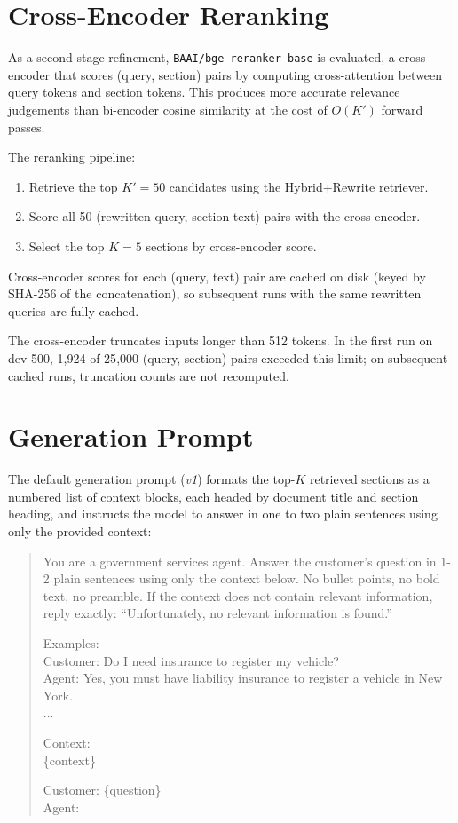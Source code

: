 \section{Cross-Encoder Reranking}\label{sec:rag:reranker}

As a second-stage refinement, \texttt{BAAI/bge-reranker-base} is evaluated, a
cross-encoder that scores (query, section) pairs by computing cross-attention
between query tokens and section tokens. This produces more accurate relevance
judgements than bi-encoder cosine similarity at the cost of $O(K')$ forward passes.

The reranking pipeline:
\begin{enumerate}
    \item Retrieve the top $K' = 50$ candidates using the Hybrid+Rewrite retriever.
    \item Score all 50 (rewritten query, section text) pairs with the cross-encoder.
    \item Select the top $K = 5$ sections by cross-encoder score.
\end{enumerate}

Cross-encoder scores for each (query, text) pair are cached on disk
(keyed by SHA-256 of the concatenation), so subsequent runs with the same rewritten
queries are fully cached.

The cross-encoder truncates inputs longer than 512 tokens.
In the first run on dev-500, 1{,}924 of 25{,}000 (query, section) pairs exceeded
this limit; on subsequent cached runs, truncation counts are not recomputed.


\section{Generation Prompt}\label{sec:rag:generation}

The default generation prompt (\emph{v1}) formats the top-$K$ retrieved sections
as a numbered list of context blocks, each headed by document title and section
heading, and instructs the model to answer in one to two plain sentences using only
the provided context:

\begin{quote}
\small\ttfamily
You are a government services agent. Answer the customer's question in 1-2 plain
sentences using only the context below. No bullet points, no bold text, no preamble.
If the context does not contain relevant information, reply exactly:
``Unfortunately, no relevant information is found.''

Examples:\\
Customer: Do I need insurance to register my vehicle?\\
Agent: Yes, you must have liability insurance to register a vehicle in New York.\\
...

Context:\\
\{context\}

Customer: \{question\}\\
Agent:
\end{quote}

